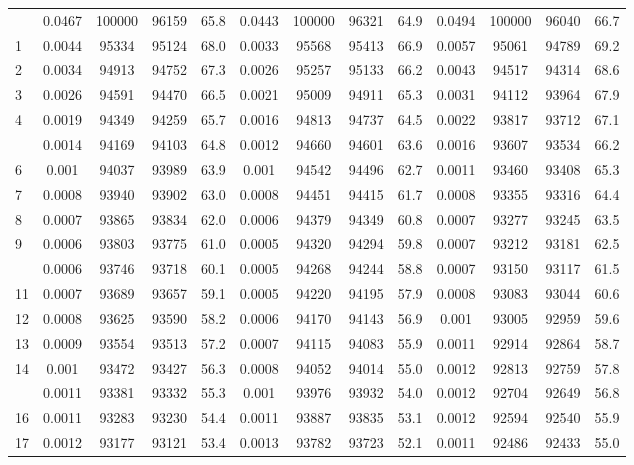 \documentclass[
  14pt,
]{article}
\begin{document}
\begin{longtable}[t]{lcccccccccccc}
\endfoot
\bottomrule
\endlastfoot
0 & 0.0467 & 100000 & 96159 & 65.8 & 0.0443 & 100000 & 96321 & 64.9 & 0.0494 & 100000 & 96040 & 66.7\\
1 & 0.0044 & 95334 & 95124 & 68.0 & 0.0033 & 95568 & 95413 & 66.9 & 0.0057 & 95061 & 94789 & 69.2\\
2 & 0.0034 & 94913 & 94752 & 67.3 & 0.0026 & 95257 & 95133 & 66.2 & 0.0043 & 94517 & 94314 & 68.6\\
3 & 0.0026 & 94591 & 94470 & 66.5 & 0.0021 & 95009 & 94911 & 65.3 & 0.0031 & 94112 & 93964 & 67.9\\
4 & 0.0019 & 94349 & 94259 & 65.7 & 0.0016 & 94813 & 94737 & 64.5 & 0.0022 & 93817 & 93712 & 67.1\\
\addlinespace
5 & 0.0014 & 94169 & 94103 & 64.8 & 0.0012 & 94660 & 94601 & 63.6 & 0.0016 & 93607 & 93534 & 66.2\\
6 & 0.001 & 94037 & 93989 & 63.9 & 0.001 & 94542 & 94496 & 62.7 & 0.0011 & 93460 & 93408 & 65.3\\
7 & 0.0008 & 93940 & 93902 & 63.0 & 0.0008 & 94451 & 94415 & 61.7 & 0.0008 & 93355 & 93316 & 64.4\\
8 & 0.0007 & 93865 & 93834 & 62.0 & 0.0006 & 94379 & 94349 & 60.8 & 0.0007 & 93277 & 93245 & 63.5\\
9 & 0.0006 & 93803 & 93775 & 61.0 & 0.0005 & 94320 & 94294 & 59.8 & 0.0007 & 93212 & 93181 & 62.5\\
\addlinespace
10 & 0.0006 & 93746 & 93718 & 60.1 & 0.0005 & 94268 & 94244 & 58.8 & 0.0007 & 93150 & 93117 & 61.5\\
11 & 0.0007 & 93689 & 93657 & 59.1 & 0.0005 & 94220 & 94195 & 57.9 & 0.0008 & 93083 & 93044 & 60.6\\
12 & 0.0008 & 93625 & 93590 & 58.2 & 0.0006 & 94170 & 94143 & 56.9 & 0.001 & 93005 & 92959 & 59.6\\
13 & 0.0009 & 93554 & 93513 & 57.2 & 0.0007 & 94115 & 94083 & 55.9 & 0.0011 & 92914 & 92864 & 58.7\\
14 & 0.001 & 93472 & 93427 & 56.3 & 0.0008 & 94052 & 94014 & 55.0 & 0.0012 & 92813 & 92759 & 57.8\\
\addlinespace
15 & 0.0011 & 93381 & 93332 & 55.3 & 0.001 & 93976 & 93932 & 54.0 & 0.0012 & 92704 & 92649 & 56.8\\
16 & 0.0011 & 93283 & 93230 & 54.4 & 0.0011 & 93887 & 93835 & 53.1 & 0.0012 & 92594 & 92540 & 55.9\\
17 & 0.0012 & 93177 & 93121 & 53.4 & 0.0013 & 93782 & 93723 & 52.1 & 0.0011 & 92486 & 92433 & 55.0\\

\end{longtable}
\end{document}
